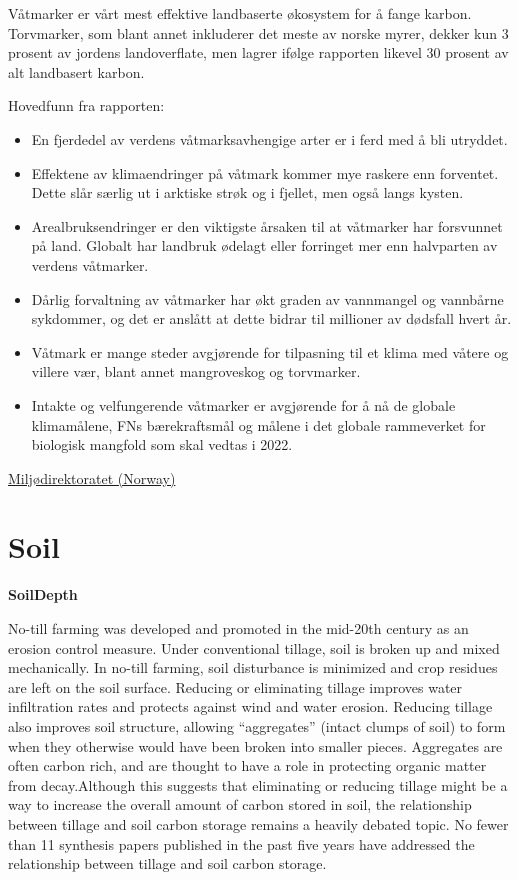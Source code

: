 \documentclass[
]{book}
\providecommand{\tightlist}{%
  \setlength{\itemsep}{0pt}\setlength{\parskip}{0pt}}
\begin{document}
Våtmarker er vårt mest effektive landbaserte økosystem for å fange karbon. Torvmarker, som blant annet inkluderer det meste av norske myrer, dekker kun 3 prosent av jordens landoverflate, men lagrer ifølge rapporten likevel 30 prosent av alt landbasert karbon.

Hovedfunn fra rapporten:

\begin{itemize}
\tightlist
\item
  En fjerdedel av verdens våtmarksavhengige arter er i ferd med å bli utryddet.
\item
  Effektene av klimaendringer på våtmark kommer mye raskere enn forventet. Dette slår særlig ut i arktiske strøk og i fjellet, men også langs kysten.
\item
  Arealbruksendringer er den viktigste årsaken til at våtmarker har forsvunnet på land. Globalt har landbruk ødelagt eller forringet mer enn halvparten av verdens våtmarker.
\item
  Dårlig forvaltning av våtmarker har økt graden av vannmangel og vannbårne sykdommer, og det er anslått at dette bidrar til millioner av dødsfall hvert år.
\item
  Våtmark er mange steder avgjørende for tilpasning til et klima med våtere og villere vær, blant annet mangroveskog og torvmarker.
\item
  Intakte og velfungerende våtmarker er avgjørende for å nå de globale klimamålene, FNs bærekraftsmål og målene i det globale rammeverket for biologisk mangfold som skal vedtas i 2022.
\end{itemize}

\href{https://www.miljodirektoratet.no/aktuelt/nyheter/2021/desember-2021/vatmark-forsvinner-tre-ganger-raskere-enn-skogene/}{Miljødirektoratet (Norway)}

\hypertarget{soil}{%
\section{Soil}\label{soil}}

\textbf{SoilDepth}

No-till farming was developed and promoted in the mid-20th century as an erosion control measure. Under conventional tillage, soil is broken up and mixed mechanically. In no-till farming, soil disturbance is minimized and crop residues are left on the soil surface. Reducing or eliminating tillage improves water infiltration rates and protects against wind and water erosion. Reducing tillage also improves soil structure, allowing ``aggregates'' (intact clumps of soil) to form when they otherwise would have been broken into smaller pieces. Aggregates are often carbon rich, and are thought to have a role in protecting organic matter from decay.Although this suggests that eliminating or reducing tillage might be a way to increase the overall amount of carbon stored in soil, the relationship between tillage and soil carbon storage remains a heavily debated topic. No fewer than 11 synthesis papers published in the past five years have addressed the relationship between tillage and soil carbon storage.
\end{document}
